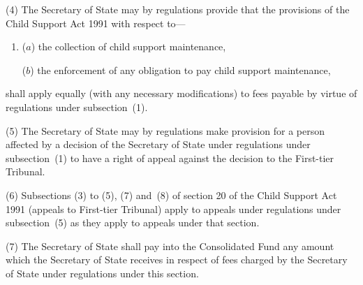 \documentclass[12pt,a4paper]{article}
\begin{document}
(4) The Secretary of State may by regulations provide that the provisions of the Child Support Act 1991 with respect to—
\begin{enumerate}\item[]
($a$) the collection of child support maintenance,

($b$) the enforcement of any obligation to pay child support maintenance,
\end{enumerate}
shall apply equally (with any necessary modifications) to fees payable by virtue of regulations under subsection~(1).

(5) The Secretary of State may by regulations make provision for a person affected by a decision of the Secretary of State under regulations under subsection~(1) to have a right of appeal against the decision to the First-tier Tribunal.

(6) Subsections (3) to (5), (7) and~(8) of section 20 of the Child Support Act 1991 (appeals to First-tier Tribunal) apply to appeals under regulations under subsection~(5) as they apply to appeals under that section.

(7) The Secretary of State shall pay into the Consolidated Fund any amount which the Secretary of State receives in respect of fees charged by the Secretary of State under regulations under this section.

\end{document}
